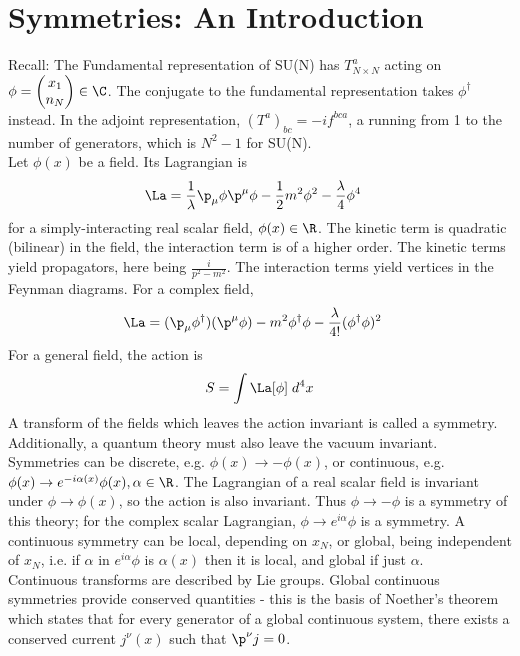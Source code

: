 \documentclass[a4paper, 11pt, normalem]{report}
\begin{document}
\section{Symmetries: An Introduction}
\vspace{-10pt}
Recall: The Fundamental representation of SU(N) has $T^a_{N\times N}$ acting on $\phi=\begin{pmatrix}x_1\\ n_N\end{pmatrix} \in \C$.
The conjugate to the fundamental representation takes $\phi^\dagger$ instead.
In the adjoint representation, $(T^a)_{bc} = -if^{bca}$, a running from 1 to the number of generators, which is $N^2-1$ for SU(N).\\
Let $\phi(x)$ be a field.
Its Lagrangian is
\begin{align}
    \La &= \frac{1}{\lambda}\p_\mu\phi\p^\mu\phi - \frac12m^2\phi^2 - \frac{\lambda}{4}\phi^4
\end{align}
for a simply-interacting real scalar field, $\phi(x)\in\R$.
The kinetic term is quadratic (bilinear) in the field, the interaction term is of a higher order.
The kinetic terms yield propagators, here being $\frac{i}{p^2-m^2}$.
The interaction terms yield vertices in the Feynman diagrams.
For a complex field,
\begin{align}
    \La &= (\p_\mu\phi^\dagger)(\p^\mu\phi) - m^2\phi^\dagger\phi - \frac{\lambda}{4!}(\phi^\dagger\phi)^2
\end{align}
For a general field, the action is
\begin{align}
    S = \int \La[\phi]\;d^4x
\end{align}
A transform of the fields which leaves the action invariant is called a symmetry.
Additionally, a quantum theory must also leave the vacuum invariant.\\
Symmetries can be discrete, e.g. $\phi(x)\to-\phi(x)$, or continuous, e.g. $\phi(x)\to e^{-i\alpha(x)}\phi(x),\alpha\in\R$.
The Lagrangian of a real scalar field is invariant under $\phi\to\phi(x)$, so the action is also invariant.
Thus $\phi\to-\phi$ is a symmetry of this theory; for the complex scalar Lagrangian, $\phi\to e^{i\alpha}\phi$ is a symmetry.
A continuous symmetry can be local, depending on $x_N$, or global, being independent of $x_N$, i.e. if $\alpha$ in $e^{i\alpha}\phi$ is $\alpha(x)$ then it is local, and global if just $\alpha$.\\
Continuous transforms are described by Lie groups.
Global continuous symmetries provide conserved quantities - this is the basis of Noether's theorem which states that for every generator of a global continuous system, there exists a conserved current $j^\nu(x)$ such that $\p^\nu j = 0$.
\end{document}
